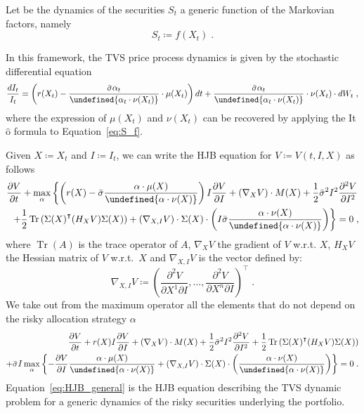 \documentclass[runningheads]{m2ef}
\DeclareMathOperator{\Tr}{Tr}
\newcommand{\tr}[1]{{#1}^{\intercal}} %
\let\norm\undefined %
\DeclarePairedDelimiter\norm{\lVert}{\rVert}
\begin{document}
	Let be the dynamics of the securities $S_t$ a generic function of the Markovian factors, namely
	\begin{equation}
	S_t \coloneqq  f(X_t) \; .
	\label{eq:S_f}\end{equation}

	In this framework, the TVS price process dynamics is given by the stochastic differential equation 
	\begin{equation}
		\frac{dI_t}{I_t} = \left(r(X_t) -  \frac{\bar{\sigma} \alpha_t}{\norm{\alpha_t \cdot \nu(X_t)}}  \cdot \mu(X_t)    \right)dt +\frac{\bar{\sigma}\alpha_t }{\norm{ \alpha_t \cdot \nu(X_t) }} \cdot \nu(X_t) \cdot dW_t \; ,
	\end{equation}
	where the expression of $\mu(X_t)$ and $\nu(X_t)$ can be recovered by applying the It$\hat{\text{o}}$ formula to Equation~\eqref{eq:S_f}.

	Given $X \coloneqq X_t$ and $I \coloneqq I_t$, we can write the HJB equation for $V \coloneqq V(t,I,X)$ as follows
	\begin{equation}
		\begin{aligned}
			\frac{\partial V}{\partial t} + \max_\alpha  \left\{   \left(r(X) - \bar{\sigma}\frac{\alpha \cdot \mu(X)}{\norm{\alpha \cdot \nu(X)}}\right) I \frac{\partial V}{\partial I} + (\nabla_X V) \cdot M(X) + \frac{1}{2} \bar{\sigma}^2I^2 \frac{\partial^2V}{\partial I^2}  \right.\\ 
			\left. +\frac{1}{2}\Tr\left(\tr{\Sigma(X)}(H_XV)\Sigma(X)\right)  + (\nabla_{X,I}V) \cdot \Sigma(X) \cdot \left(I\bar{\sigma}\frac{\alpha \cdot \nu(X)}{\norm{\alpha \cdot \nu(X)}}\right)\right\} = 0 \; ,
		\end{aligned}
	\end{equation}
	where $\Tr(A)$ is the trace operator of $A$, $\nabla_X V$ the gradient of $V$ w.r.t. $X$, $H_XV$ the Hessian matrix of $V$ w.r.t.~$X$ and $\nabla_{X,I}V$ is the vector defined by:
	\begin{equation}
		\nabla_{X,I} V \coloneqq \tr{\left(\frac{\partial^2 V}{\partial X^1 \partial I},\dots, \frac{\partial^2 V}{\partial X^n \partial I} \right)} \; .
	\end{equation}
	We take out from the maximum operator all the elements that do not depend on the risky allocation strategy $\alpha$
	\begin{equation}
		\begin{aligned}
			\frac{\partial V}{\partial t} +   r(X) I \frac{\partial V}{\partial I} + (\nabla_X V) \cdot M(X) + \frac{1}{2} \bar{\sigma}^2I^2 \frac{\partial^2V}{\partial I^2} + \frac{1}{2}\Tr\left(\tr{\Sigma(X)}(H_XV)\Sigma(X)\right)  \\ 
			+\bar{\sigma}I\max_\alpha  \left\{  -\frac{\partial V}{\partial I}   \frac{\alpha \cdot \mu(X)}{\norm{\alpha \cdot \nu(X)}} + 
			(\nabla_{X,I}V) \cdot \Sigma(X) \cdot \left(\frac{\alpha \cdot \nu(X)}{\norm{\alpha \cdot \nu(X)}}\right)\right\} = 0 \; .
			\end{aligned}
	\label{eq:HJB_general}\end{equation}
	Equation~\eqref{eq:HJB_general} is the HJB equation describing the TVS dynamic problem for a generic dynamics of the risky securities underlying the portfolio.
\end{document}
